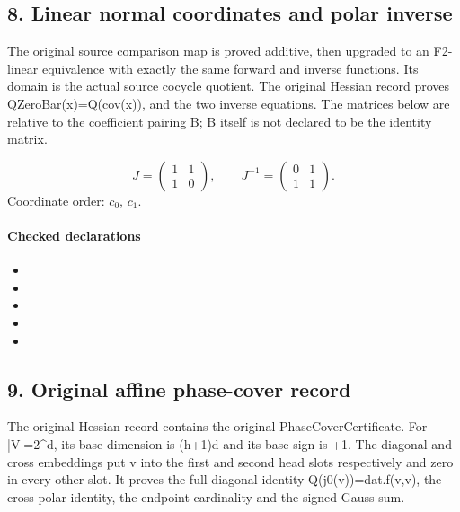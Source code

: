 \subsection*{8. Linear normal coordinates and polar inverse}
The original source comparison map is proved additive, then upgraded to an F2-linear equivalence with exactly the same forward and inverse functions. Its domain is the actual source cocycle quotient. The original Hessian record proves QZeroBar(x)=Q(cov(x)), and the two inverse equations. The matrices below are relative to the coefficient pairing B; B itself is not declared to be the identity matrix.

\[J=\begin{pmatrix}1&1\\1&0\end{pmatrix},\qquad J^{-1}=\begin{pmatrix}0&1\\1&1\end{pmatrix}.\]
Coordinate order: $c_0$, $c_1$.
\paragraph{Checked declarations}
\begin{itemize}
\item {}
\item {}
\item {}
\item {}
\item {}
\end{itemize}

\subsection*{9. Original affine phase-cover record}
The original Hessian record contains the original PhaseCoverCertificate. For |V|=2\textasciicircum{}d, its base dimension is (h+1)d and its base sign is +1. The diagonal and cross embeddings put v into the first and second head slots respectively and zero in every other slot. It proves the full diagonal identity Q(j0(v))=dat.f(v,v), the cross-polar identity, the endpoint cardinality and the signed Gauss sum.

